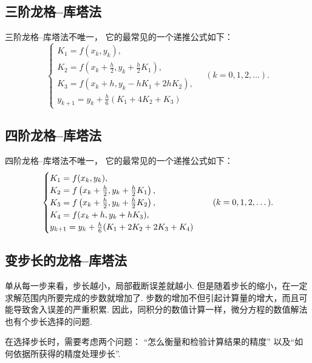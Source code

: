 \subsection{三阶龙格--库塔法}
三阶龙格--库塔法不唯一，
它的最常见的一个递推公式如下：\begin{equation}
	\begin{cases}
		K_1 = f(x_k,y_k), \\
		K_2 = f\left( x_k + \frac{h}{2}, y_k + \frac{h}{2} K_1 \right), \\
		K_3 = f(x_k + h,y_k - h K_1 + 2 h K_2), \\
		y_{k+1} = y_k + \frac{h}{6} (K_1 + 4 K_2 + K_3)
	\end{cases}
	\quad(k=0,1,2,\dotsc).
\end{equation}

\subsection{四阶龙格--库塔法}
四阶龙格--库塔法不唯一，
它的最常见的一个递推公式如下：\begin{equation}\label{equation:常微分方程初值问题的数值解法.4阶龙格库塔法}
	\def\arraystretch{1.5}
	\begin{cases}
		K_1 = f(x_k,y_k), \\
		K_2 = f\left( x_k + \frac{h}{2}, y_k + \frac{h}{2} K_1 \right), \\
		K_3 = f\left( x_k + \frac{h}{2}, y_k + \frac{h}{2} K_2 \right), \\
		K_4 = f(x_k + h,y_k + h K_3), \\
		y_{k+1} = y_k + \frac{h}{6} (K_1 + 2 K_2 + 2 K_3 + K_4)
	\end{cases}
	\quad(k=0,1,2,\dotsc).
\end{equation}

\subsection{变步长的龙格--库塔法}
单从每一步来看，步长越小，局部截断误差就越小.
但是随着步长的缩小，在一定求解范围内所要完成的步数就增加了.
步数的增加不但引起计算量的增大，而且可能导致舍入误差的严重积累.
因此，同积分的数值计算一样，微分方程的数值解法也有个步长选择的问题.

在选择步长时，需要考虑两个问题：
“怎么衡量和检验计算结果的精度”
以及“如何依据所获得的精度处理步长”.

